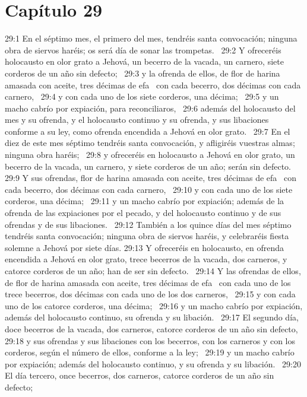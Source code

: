\section*{Capítulo 29 }
29:1 En el séptimo mes, el primero del mes, tendréis santa convocación; ninguna obra de siervos haréis; os será día de sonar las trompetas.  
29:2 Y ofreceréis holocausto en olor grato a Jehová, un becerro de la vacada, un carnero, siete corderos de un año sin defecto;  
29:3 y la ofrenda de ellos, de flor de harina amasada con aceite, tres décimas de efa  con cada becerro, dos décimas con cada carnero,  
29:4 y con cada uno de los siete corderos, una décima;  
29:5 y un macho cabrío por expiación, para reconciliaros,  
29:6 además del holocausto del mes y su ofrenda, y el holocausto continuo y su ofrenda, y sus libaciones conforme a su ley, como ofrenda encendida a Jehová en olor grato.  
29:7 En el diez de este mes séptimo tendréis santa convocación, y afligiréis vuestras almas; ninguna obra haréis;  
29:8 y ofreceréis en holocausto a Jehová en olor grato, un becerro de la vacada, un carnero, y siete corderos de un año; serán sin defecto.  
29:9 Y sus ofrendas, flor de harina amasada con aceite, tres décimas de efa  con cada becerro, dos décimas con cada carnero,  
29:10 y con cada uno de los siete corderos, una décima;  
29:11 y un macho cabrío por expiación; además de la ofrenda de las expiaciones por el pecado, y del holocausto continuo y de sus ofrendas y de sus libaciones.  
29:12 También a los quince días del mes séptimo tendréis santa convocación; ninguna obra de siervos haréis, y celebraréis fiesta solemne a Jehová por siete días. 
29:13 Y ofreceréis en holocausto, en ofrenda encendida a Jehová en olor grato, trece becerros de la vacada, dos carneros, y catorce corderos de un año; han de ser sin defecto.  
29:14 Y las ofrendas de ellos, de flor de harina amasada con aceite, tres décimas de efa  con cada uno de los trece becerros, dos décimas con cada uno de los dos carneros,  
29:15 y con cada uno de los catorce corderos, una décima;  
29:16 y un macho cabrío por expiación, además del holocausto continuo, su ofrenda y su libación.  
29:17 El segundo día, doce becerros de la vacada, dos carneros, catorce corderos de un año sin defecto,  
29:18 y sus ofrendas y sus libaciones con los becerros, con los carneros y con los corderos, según el número de ellos, conforme a la ley;  
29:19 y un macho cabrío por expiación; además del holocausto continuo, y su ofrenda y su libación.  
29:20 El día tercero, once becerros, dos carneros, catorce corderos de un año sin defecto;  
